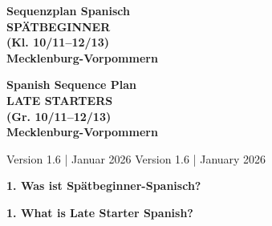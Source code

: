 \documentclass[10pt,a4paper]{article}
\newcommand{\secbil}[2]{%
\vspace{6pt}
\noindent\colorbox{spaet}{\parbox{0.48\textwidth}{\color{white}\bfseries\small #1}}%
\hfill%
\colorbox{english}{\parbox{0.48\textwidth}{\color{white}\bfseries\small #2}}
\vspace{3pt}
}
\begin{document}
\begin{center}
\colorbox{spaet}{\parbox{0.48\textwidth}{\centering\color{white}\Large\bfseries\vspace{4pt}
Sequenzplan Spanisch\\SPÄTBEGINNER\\(Kl. 10/11--12/13)\\Mecklenburg-Vorpommern
\vspace{4pt}}}%
\hfill%
\colorbox{english}{\parbox{0.48\textwidth}{\centering\color{white}\Large\bfseries\vspace{4pt}
Spanish Sequence Plan\\LATE STARTERS\\(Gr. 10/11--12/13)\\Mecklenburg-Vorpommern
\vspace{4pt}}}
\end{center}

\vspace{2mm}
\begin{center}
\small Version 1.6 | Januar 2026 \hfill \textcolor{english}{Version 1.6 | January 2026}
\end{center}

\vspace{3mm}

\secbil{1. Was ist Spätbeginner-Spanisch?}{1. What is Late Starter Spanish?}
\end{document}
